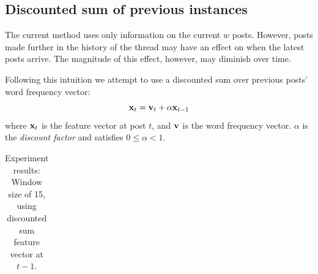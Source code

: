 \documentclass[12 pt]{article}
\begin{document}
\subsection{Discounted sum of previous instances}

The current method uses only information on the current $w$ posts. However, posts made further in the history of the thread may have an effect on when the latest posts arrive. The magnitude of this effect, however, may diminish over time.

Following this intuition we attempt to use a discounted sum over previous posts' word frequency vector:
\[
	\mathbf{x}_t = \mathbf{v}_t + \alpha \mathbf{x}_{t-1}
\]
where $\mathbf{x}_t$ is the feature vector at post $t$, and $\mathbf{v}$ is the word frequency vector. $\alpha$ is the \emph{discount factor} and satisfies $0 \leq \alpha < 1$.


\begin{table}
	\footnotesize
	\begin{centering}
	\begin{tabular}{|l|c|c|c|c|c|c|c|c|}
	\hline
	
	\hline
	\end{tabular}
	\caption{Experiment results: Window size of 15, using discounted sum feature vector at $t-1$.}
	\label{exp_decay}
\end{centering}
\end{table}





\end{document}
